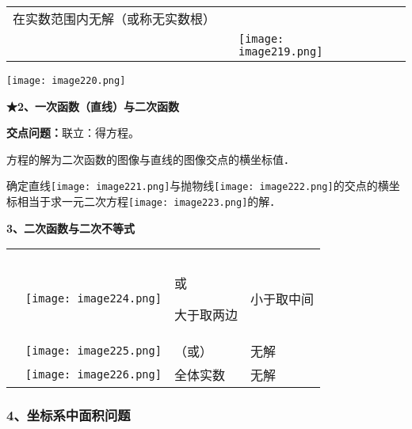 \begin{longtable}[]{@{}lllll@{}}
\begin{minipage}[t]{0.17\columnwidth}
在实数范围内无解（或称无实数根）\strut
\end{minipage}\tabularnewline
& &
\texttt{[image: image219.png]}
& &\tabularnewline
\bottomrule
\end{longtable}

\texttt{[image: image220.png]}

\textbf{★2、一次函数（直线）与二次函数}

\textbf{交点问题：}联立：得方程。

方程的解为二次函数的图像与直线的图像交点的横坐标值．

确定直线\texttt{[image: image221.png]}与抛物线\texttt{[image: image222.png]}的交点的横坐标相当于求一元二次方程\texttt{[image: image223.png]}的解．

\textbf{3、二次函数与二次不等式}

\begin{longtable}[]{@{}llll@{}}
\toprule
\endhead
& & &\tabularnewline
& & &\tabularnewline
\begin{minipage}[t]{0.22\columnwidth}\raggedright
\strut
\end{minipage} & \begin{minipage}[t]{0.22\columnwidth}\raggedright
\texttt{[image: image224.png]}\strut
\end{minipage} & \begin{minipage}[t]{0.22\columnwidth}\raggedright
或

大于取两边\strut
\end{minipage} & \begin{minipage}[t]{0.22\columnwidth}\raggedright
小于取中间\strut
\end{minipage}\tabularnewline
& \texttt{[image: image225.png]}
& （或） & 无解\tabularnewline
&
\texttt{[image: image226.png]}
& 全体实数 & 无解\tabularnewline
\bottomrule
\end{longtable}

\hypertarget{ux5750ux6807ux7cfbux4e2dux9762ux79efux95eeux9898}{%
\subsubsection{\texorpdfstring{\textbf{4、坐标系中面积问题}}{4、坐标系中面积问题}}\label{ux5750ux6807ux7cfbux4e2dux9762ux79efux95eeux9898}}

